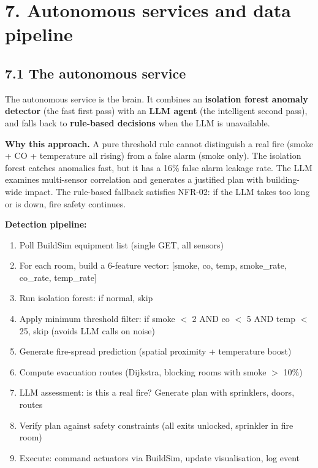 \documentclass[11pt]{article}
\providecommand{\tightlist}{\setlength{\itemsep}{0pt}\setlength{\parskip}{0pt}}
\begin{document}
\section{7. Autonomous services and data pipeline}

\subsection{7.1 The autonomous service}

The autonomous service is the brain. It combines an \textbf{isolation forest anomaly detector} (the fast first pass) with an \textbf{LLM agent} (the intelligent second pass), and falls back to \textbf{rule-based decisions} when the LLM is unavailable.

\textbf{Why this approach.} A pure threshold rule cannot distinguish a real fire (smoke + CO + temperature all rising) from a false alarm (smoke only). The isolation forest catches anomalies fast, but it has a 16\% false alarm leakage rate. The LLM examines multi-sensor correlation and generates a justified plan with building-wide impact. The rule-based fallback satisfies NFR-02: if the LLM takes too long or is down, fire safety continues.

\textbf{Detection pipeline:}
\begin{enumerate}\tightlist
  \item Poll BuildSim equipment list (single GET, all sensors)
  \item For each room, build a 6-feature vector: [smoke, co, temp, smoke\_rate, co\_rate, temp\_rate]
  \item Run isolation forest: if normal, skip
  \item Apply minimum threshold filter: if smoke $<$ 2 AND co $<$ 5 AND temp $<$ 25, skip (avoids LLM calls on noise)
  \item Generate fire-spread prediction (spatial proximity + temperature boost)
  \item Compute evacuation routes (Dijkstra, blocking rooms with smoke $>$ 10\%)
  \item LLM assessment: is this a real fire? Generate plan with sprinklers, doors, routes
  \item Verify plan against safety constraints (all exits unlocked, sprinkler in fire room)
  \item Execute: command actuators via BuildSim, update visualisation, log event
\end{enumerate}
\end{document}
